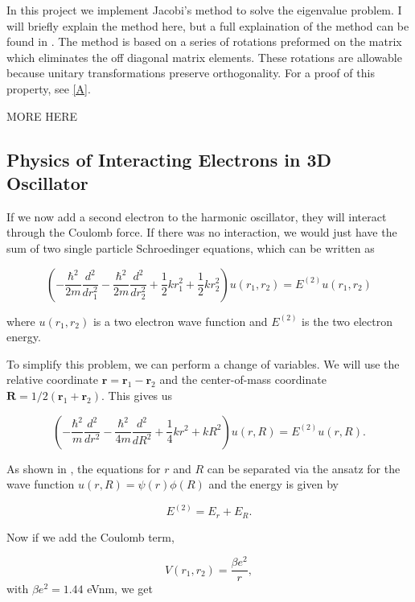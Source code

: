 \documentclass[%
oneside,                 %
final,                   %
10pt]{article}
\begin{document}
In this project we implement Jacobi's method to solve the eigenvalue problem.  I will briefly explain the method here, but a full explaination of the method can be found in \cite{LectureNotes}.  The method is based on a series of rotations preformed on the matrix which eliminates the off diagonal matrix elements.  These rotations are allowable because unitary transformations preserve orthogonality.  For a proof of this property, see \ref{A}.

MORE HERE

\subsection{Physics of Interacting Electrons in 3D Oscillator}

If we now add a second electron to the harmonic oscillator, they will interact through the Coulomb force.  If there was no interaction, we would just have the sum of two single particle Schroedinger equations, which can be written as 

\begin{equation*}
\left(  -\frac{\hbar^2}{2 m} \frac{d^2}{dr_1^2} -\frac{\hbar^2}{2 m} \frac{d^2}{dr_2^2}+ \frac{1}{2}k r_1^2+ \frac{1}{2}k r_2^2\right)u(r_1,r_2)  = E^{(2)} u(r_1,r_2) 
\end{equation*}


where $u(r_1,r_2)$ is a two electron wave function and $E^{(2)}$ is the two electron energy.

To simplify this problem, we can perform a change of variables.  We will use the relative coordinate $\mathbf{r} = \mathbf{r}_1-\mathbf{r}_2$
and the center-of-mass coordinate $\mathbf{R} = 1/2(\mathbf{r}_1+\mathbf{r}_2)$.  This gives us

\begin{equation*}
\left(  -\frac{\hbar^2}{m} \frac{d^2}{dr^2} -\frac{\hbar^2}{4 m} \frac{d^2}{dR^2}+ \frac{1}{4} k r^2+  kR^2\right)u(r,R)  = E^{(2)} u(r,R).
\end{equation*}

As shown in \cite{Broida}, the equations for $r$ and $R$ can be separated via the ansatz for the 
wave function $u(r,R) = \psi(r)\phi(R)$ and the energy is given by

\begin{equation*}
E^{(2)}=E_r+E_R.
\end{equation*}

Now if we add the Coulomb term,

\begin{equation*}
V(r_1,r_2) =\frac{\beta e^2}{r},
\end{equation*}
with $\beta e^2=1.44$ eVnm, we get
\end{document}
